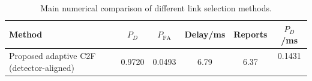 \begin{table}[t]
    \centering
    \caption{Main numerical comparison of different link selection methods.}
    \label{tab:main_summary}
    \begin{tabular}{l c c c c c}
        \hline
        Method & $P_D$ & $P_{\mathrm{FA}}$ & Delay/ms & Reports & $P_D$/ms \\
        \hline
        Proposed adaptive C2F (detector-aligned) & 0.9720 & 0.0493 & 6.79 & 6.37 & 0.1431 \
        \hline
    \end{tabular}
\end{table}
